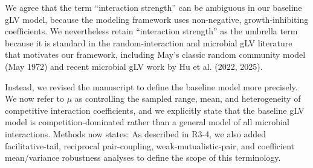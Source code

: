\responselabel
We agree that the term ``interaction strength'' can be ambiguous in our baseline gLV model, because the modeling framework uses non-negative, growth-inhibiting coefficients. We nevertheless retain ``interaction strength'' as the umbrella term because it is standard in the random-interaction and microbial gLV literature that motivates our framework, including May's classic random community model (May 1972) and recent microbial gLV work by Hu et al. (2022, 2025).

Instead, we revised the manuscript to define the baseline model more precisely. We now refer to $\mu$ as controlling the sampled range, mean, and heterogeneity of competitive interaction coefficients, and we explicitly state that the baseline gLV model is competition-dominated rather than a general model of all microbial interactions. Methods now states:  As described in R3-4, we also added facilitative-tail, reciprocal pair-coupling, weak-mutualistic-pair, and coefficient mean/variance robustness analyses to define the scope of this terminology.
